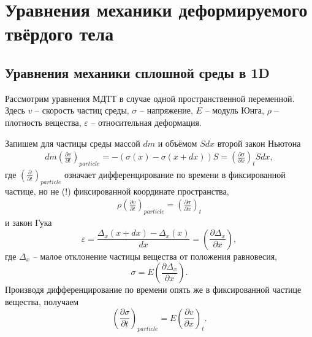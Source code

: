 \section{Уравнения механики деформируемого твёрдого тела}
\subsection{Уравнения механики сплошной среды в 1D}
\label{model-1d}
Рассмотрим уравнения МДТТ в случае одной пространственной переменной. Здесь $v$ -- скорость частиц среды, $\sigma$ -- напряжение, $E$ -- модуль Юнга, $\rho$ -- плотность вещества, $\varepsilon$ -- относительная деформация.

Запишем для частицы среды массой $dm$ и объёмом $S dx$ второй закон Ньютона
\begin{eqnarray}
dm \left(\frac{\partial v}{\partial t}\right)_{particle} = - \left(\sigma(x) - \sigma(x+dx)\right) S = 
\left(\frac{\partial \sigma}{\partial x}\right)_{t} S dx,
\end{eqnarray}
где $(\frac{\partial}{\partial t})_{particle}$ означает дифференцирование по времени в фиксированной частице, но не (!) фиксированной координате пространства,
\begin{eqnarray}
\rho\left(\frac{\partial v}{\partial t}\right)_{particle} = \left(\frac{\partial \sigma}{\partial x}\right)_{t} 
\label{newton}
\end{eqnarray}
и закон Гука
\begin{equation}
\varepsilon = \frac{\Delta_x(x+dx) - \Delta_x(x)}{dx} = 
\left(\frac{\partial \Delta_x}{\partial x}\right),
\end{equation}
где $\Delta_x$ -- малое отклонение частицы вещества от положения равновесия,
\begin{equation}
\sigma = E\left(\frac{\partial \Delta_x}{\partial x}\right).
\end{equation}
Производя дифференцирование по времени опять же в фиксированной частице вещества, получаем
\begin{equation}
\left(\frac{\partial \sigma}{\partial t}\right)_{particle} = E \left( \frac{\partial v}{\partial x} \right) _{t}.
\label{guk}
\end{equation}

